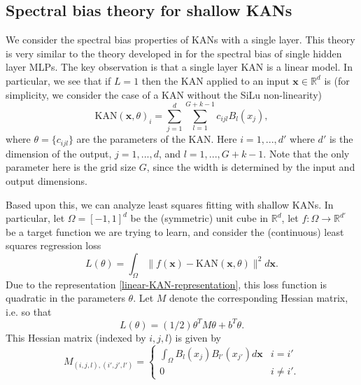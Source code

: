 \documentclass[12pt]{caltech_thesis}
\numberwithin{equation}{section}
\begin{document}
\subsection{Spectral bias theory for shallow KANs}
We consider the spectral bias properties of KANs with a single layer. This theory is very similar to the theory developed in \cite{hong2022activation,zhang2023shallow,ronen2019convergence} for the spectral bias of single hidden layer MLPs. The key observation is that a single layer KAN is a linear model. In particular, we see that if $L = 1$ then the KAN applied to an input $\mathbf{x}\in \mathbb{R}^d$ is (for simplicity, we consider the case of a KAN without the SiLu non-linearity)
\begin{equation}\label{linear-KAN-representation}
{\text{KAN}}(\mathbf{x},\theta)_i=\sum_{j=1}^d\sum_{l=1}^{G+k-1} c_{ijl}B_l(x_j),
\end{equation}
where $\theta = \{c_{ijl}\}$ are the parameters of the KAN. Here $i=1,...,d'$ where $d'$ is the dimension of the output, $j = 1,...,d$, and $l = 1,...,G+k-1$. Note that the only parameter here is the grid size $G$, since the width is determined by the input and output dimensions.

Based upon this, we can analyze least squares fitting with shallow KANs. In particular, let $\Omega = [-1,1]^d$ be the (symmetric) unit cube in $\mathbb{R}^d$, let $f:\Omega\rightarrow \mathbb{R}^{d'}$ be a target function we are trying to learn, and consider the (continuous) least squares regression loss
\begin{equation}\label{least-squares-fitting}
    L(\theta) = \int_{\Omega}\|f(\mathbf{x}) - {\text{KAN}}(\mathbf{x},\theta)\|^2d\mathbf{x}.
\end{equation}
Due to the representation \eqref{linear-KAN-representation}, this loss function is quadratic in the parameters $\theta$. Let $M$ denote the corresponding Hessian matrix, i.e. so that $$L(\theta) = (1/2)\theta^TM\theta + b^T\theta.$$ This Hessian matrix (indexed by $i,j,l$) is given by
\begin{equation}\label{hessian-matrix-equation}
    M_{(i,j,l),(i',j',l')} = \begin{cases}
        \int_\Omega B_l(x_j)B_{l'}(x_{j'})d\mathbf{x} & i = i'\\
        0 & i\neq i'.
    \end{cases}
\end{equation}
\end{document}
